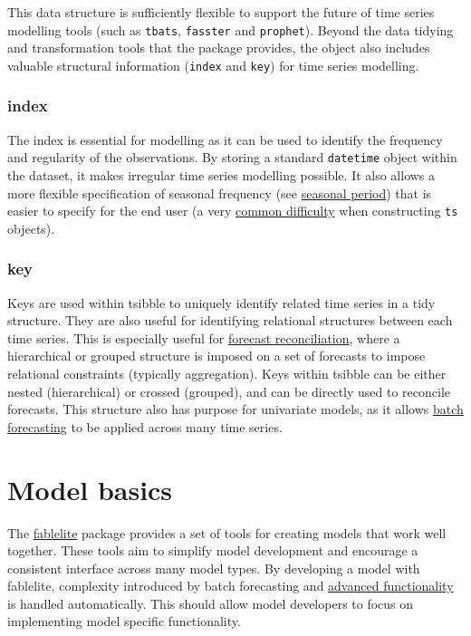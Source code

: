 \documentclass[]{book}
\begin{document}
This data structure is sufficiently flexible to support the future of time series modelling tools (such as \texttt{tbats}, \texttt{fasster} and \texttt{prophet}). Beyond the data tidying and transformation tools that the package provides, the object also includes valuable structural information (\texttt{index} and \texttt{key}) for time series modelling.

\hypertarget{index}{%
\subsection{index}\label{index}}

The index is essential for modelling as it can be used to identify the frequency and regularity of the observations. By storing a standard \texttt{datetime} object within the dataset, it makes irregular time series modelling possible. It also allows a more flexible specification of seasonal frequency (see \protect\hyperlink{interface}{seasonal period}) that is easier to specify for the end user (a very \href{https://robjhyndman.com/hyndsight/seasonal-periods/}{common difficulty} when constructing \texttt{ts} objects).

\hypertarget{key}{%
\subsection{key}\label{key}}

Keys are used within tsibble to uniquely identify related time series in a tidy structure. They are also useful for identifying relational structures between each time series. This is especially useful for \href{https://otexts.org/fpp2/hierarchical.html}{forecast reconciliation}, where a hierarchical or grouped structure is imposed on a set of forecasts to impose relational constraints (typically aggregation). Keys within tsibble can be either nested (hierarchical) or crossed (grouped), and can be directly used to reconcile forecasts. This structure also has purpose for univariate models, as it allows \protect\hyperlink{advanced}{batch forecasting} to be applied across many time series.

\hypertarget{model}{%
\chapter{Model basics}\label{model}}

The \href{https://github.com/tidyverts/fablelite}{fablelite} package provides a set of tools for creating models that work well together. These tools aim to simplify model development and encourage a consistent interface across many model types. By developing a model with fablelite, complexity introduced by batch forecasting and \protect\hyperlink{advanced}{advanced functionality} is handled automatically. This should allow model developers to focus on implementing model specific functionality.
\end{document}
